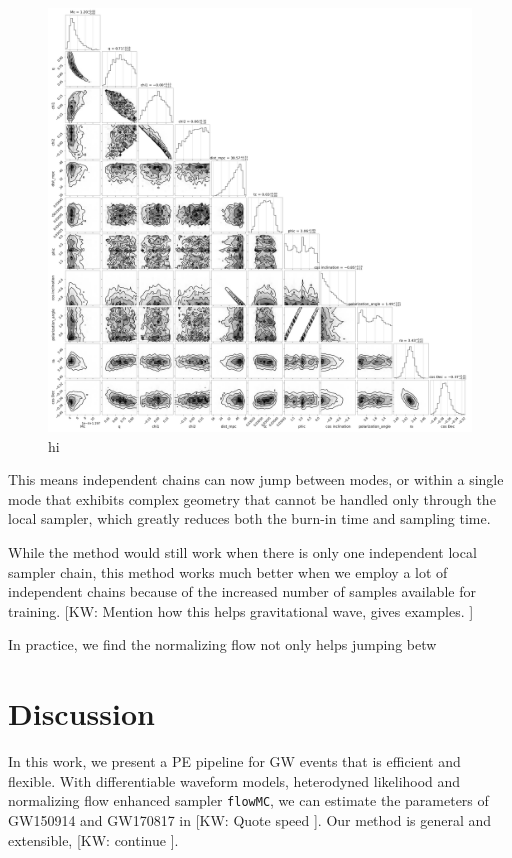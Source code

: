 \documentclass[twocolumn]{aastex631}
\newcommand{\kw}[1]{{\color{rb4}[KW: #1 ]}}
\begin{document}
\begin{figure}
\includegraphics[width=0.99\linewidth]{static/GW170817.png}
\caption{
    hi
}
\label{fig:GW170817}
\end{figure}

This means independent chains can now jump between modes, or within a single
mode that exhibits complex geometry that cannot be handled only through the
local sampler, which greatly reduces both the burn-in time and sampling time.

While the method would still work when there is only one independent local
sampler chain, this method works much better when we employ a lot of independent
chains because of the increased number of samples available for training. 
\kw{Mention how this helps gravitational wave, gives examples.}

In practice, we find the normalizing flow not only helps jumping betw


\section{Discussion}
\label{sec: Discussion}

In this work, we present a PE pipeline for GW events that is efficient and
flexible. With differentiable waveform models, heterodyned likelihood and
normalizing flow enhanced sampler \texttt{flowMC}, we can estimate the
parameters of GW150914 and GW170817 in \kw{Quote speed}. Our method is general
and extensible, \kw{continue}.
\end{document}
